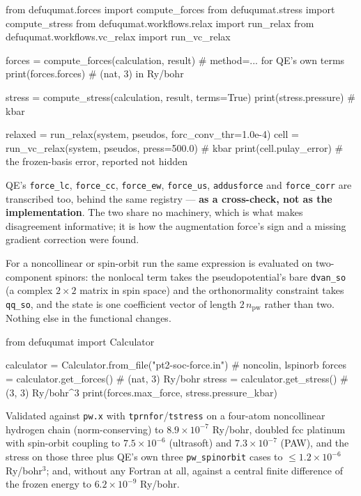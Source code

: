 \documentclass[11pt,a4paper]{article}
\newcommand{\code}[1]{\texttt{\small #1}}
\begin{document}
\begin{pycode}
from defuqumat.forces import compute_forces
from defuqumat.stress import compute_stress
from defuqumat.workflows.relax import run_relax
from defuqumat.workflows.vc_relax import run_vc_relax

forces = compute_forces(calculation, result)      # method=... for QE's own terms
print(forces.forces)                              # (nat, 3) in Ry/bohr

stress = compute_stress(calculation, result, terms=True)
print(stress.pressure)                            # kbar

relaxed = run_relax(system, pseudos, forc_conv_thr=1.0e-4)
cell = run_vc_relax(system, pseudos, press=500.0) # kbar
print(cell.pulay_error)   # the frozen-basis error, reported not hidden
\end{pycode}

QE's \code{force\_lc}, \code{force\_cc}, \code{force\_ew}, \code{force\_us},
\code{addusforce} and \code{force\_corr} are transcribed too, behind the same
registry --- \textbf{as a cross-check, not as the implementation}. The two share
no machinery, which is what makes disagreement informative; it is how the
augmentation force's sign and a missing gradient correction were found.

For a noncollinear or spin-orbit run the same expression is evaluated on
two-component spinors: the nonlocal term takes the pseudopotential's bare
\code{dvan\_so} (a complex $2\times2$ matrix in spin space) and the
orthonormality constraint takes \code{qq\_so}, and the state is one coefficient
vector of length $2\,n_{\mathrm{pw}}$ rather than two. Nothing else in the
functional changes.

\begin{pycode}
from defuqumat import Calculator

calculator = Calculator.from_file("pt2-soc-force.in")   # noncolin, lspinorb
forces = calculator.get_forces()          # (nat, 3) Ry/bohr
stress = calculator.get_stress()          # (3, 3)   Ry/bohr^3
print(forces.max_force, stress.pressure_kbar)
\end{pycode}

Validated against \code{pw.x} with \code{tprnfor}/\code{tstress} on a four-atom
noncollinear hydrogen chain (norm-conserving) to $8.9\times10^{-7}$ Ry/bohr,
doubled fcc platinum with spin-orbit coupling to $7.5\times10^{-6}$ (ultrasoft)
and $7.3\times10^{-7}$ (PAW), and the stress on those three plus QE's own three
\code{pw\_spinorbit} cases to $\le 1.2\times10^{-6}$ Ry/bohr$^3$; and, without
any Fortran at all, against a central finite difference of the frozen energy to
$6.2\times10^{-9}$ Ry/bohr.
\end{document}
